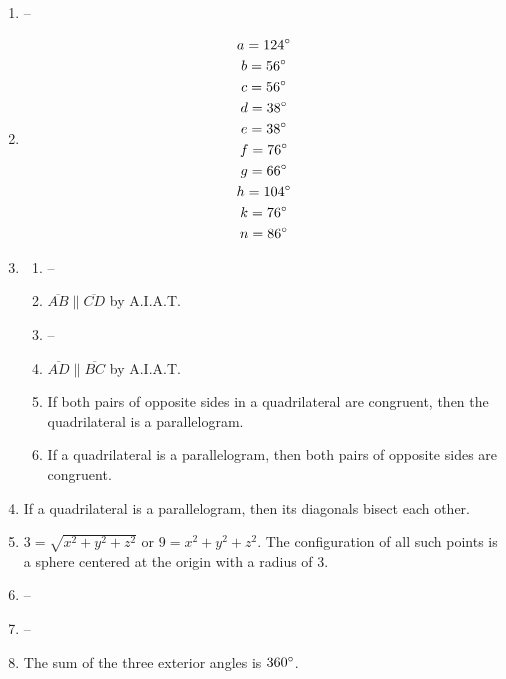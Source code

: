 \documentclass{article}
\begin{document}
\begin{enumerate}
\item --

\item

	\begin{gather*}
	a = 124 \degree \\
	b = 56 \degree \\
	c = 56 \degree \\
	d = 38 \degree \\
	e = 38 \degree \\
	f = 76 \degree \\
	g = 66 \degree \\
	h = 104 \degree \\
	k = 76 \degree \\
	n = 86 \degree
	\end{gather*}
	
\item

	\begin{enumerate}
	
	\item --
	
	\item $\overline{AB} \parallel \overline{CD}$ by A.I.A.T.
	
	\item --
	
	\item $\overline{AD} \parallel \overline{BC}$ by A.I.A.T.
	
	\item If both pairs of opposite sides in a quadrilateral are congruent, then the quadrilateral is a parallelogram.
	
	\item If a quadrilateral is a parallelogram, then both pairs of opposite sides are congruent.
	
	\end{enumerate}
	
\item If a quadrilateral is a parallelogram, then its diagonals bisect each other.

\item $3 = \sqrt{x^2 + y^2 + z^2}$ or $9 = x^2 + y^2 + z^2$. The configuration of all such points is a sphere centered at the origin with a radius of 3.

\item --

\item --

\item The sum of the three exterior angles is $360 \degree$.


\end{enumerate}
\end{document}
